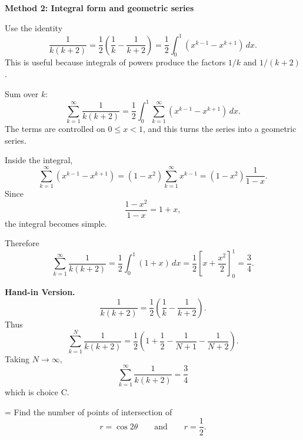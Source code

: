 \documentclass[a4paper,12pt,twocolumn]{article}
\newlength{\problemnumberwidth}
\newenvironment{solutionbox}{\begin{framed}}{\end{framed}}
\newcommand{\problem}[3]{%
  \Needspace{10\baselineskip}%
  \phantomsection\label{#1}%
  \par\vspace{0.8em}%
  \noindent
  \hangindent=\problemnumberwidth
  \hangafter=1
  \makebox[\problemnumberwidth][l]{\textbf{#2.}}#3\par
}
\begin{document}
\begin{solutionbox}
\textbf{Method 2: Integral form and geometric series}

\begin{steps}
\item Use the identity
\[
\frac{1}{k(k+2)}
=\frac12\left(\frac1k-\frac{1}{k+2}\right)
=\frac12\int_0^1\left(x^{k-1}-x^{k+1}\right)\,dx.
\]
This is useful because integrals of powers produce the factors \(1/k\) and \(1/(k+2)\).

\item Sum over \(k\):
\[
\sum_{k=1}^{\infty}\frac{1}{k(k+2)}
=\frac12\int_0^1\sum_{k=1}^{\infty}\left(x^{k-1}-x^{k+1}\right)\,dx.
\]
The terms are controlled on \(0\le x<1\), and this turns the series into a geometric series.

\item Inside the integral,
\[
\sum_{k=1}^{\infty}\left(x^{k-1}-x^{k+1}\right)
=(1-x^2)\sum_{k=1}^{\infty}x^{k-1}
=(1-x^2)\frac{1}{1-x}.
\]
Since
\[
\frac{1-x^2}{1-x}=1+x,
\]
the integral becomes simple.

\item Therefore
\[
\sum_{k=1}^{\infty}\frac{1}{k(k+2)}
=\frac12\int_0^1(1+x)\,dx
=\frac12\left[x+\frac{x^2}{2}\right]_0^1
=\frac34.
\]
\end{steps}

\textbf{Hand-in Version.}
\[
\frac{1}{k(k+2)}
=\frac12\left(\frac1k-\frac1{k+2}\right).
\]
Thus
\[
\sum_{k=1}^{N}\frac{1}{k(k+2)}
=\frac12\left(1+\frac12-\frac1{N+1}-\frac1{N+2}\right).
\]
Taking \(N\to\infty\),
\[
\boxed{\sum_{k=1}^{\infty}\frac{1}{k(k+2)}=\frac34}
\]
which is choice \(\boxed{\text{C}}\).
\end{solutionbox}

\problem{prob:xi}{xi}{Find the number of points of intersection of
\[
r=\cos 2\theta
\qquad\text{and}\qquad
r=\frac12.
\]}
\end{document}
